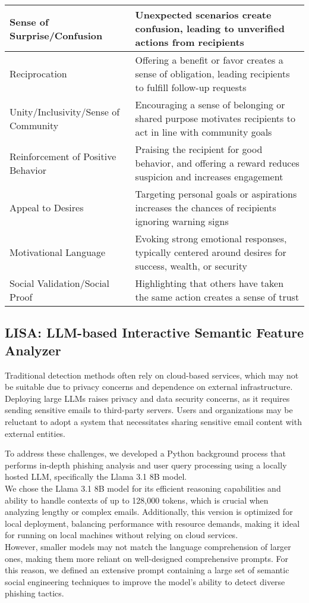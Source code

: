 \begin{table*}[ht]
\begin{tabular}{|p{4cm}|p{12cm}|}
\hline
Sense of Surprise/Confusion & Unexpected scenarios create confusion, leading to unverified actions from recipients \\ [0.4em]
\hline
Reciprocation & Offering a benefit or favor creates a sense of obligation, leading recipients to fulfill follow-up requests \\ [0.4em]
\hline
Unity/Inclusivity/Sense of Community & Encouraging a sense of belonging or shared purpose motivates recipients to act in line with community goals \\ [0.4em]
\hline
Reinforcement of Positive Behavior & Praising the recipient for good behavior, and offering a reward reduces suspicion and increases engagement \\ [0.4em]
\hline
Appeal to Desires & Targeting personal goals or aspirations increases the chances of recipients ignoring warning signs \\ [0.4em]
\hline
Motivational Language & Evoking strong emotional responses, typically centered around desires for success, wealth, or security \\[0.4em]
\hline
Social Validation/Social Proof & Highlighting that others have taken the same action creates a sense of trust \\ [0.4em]
\hline
\end{tabular}
\end{table*}



\subsection{LISA: LLM-based Interactive Semantic Feature Analyzer}
\label{sec:lisa}

Traditional detection methods often rely on cloud-based services, which may not be suitable due to privacy concerns and dependence on external infrastructure. Deploying large LLMs raises privacy and data security concerns, as it requires sending sensitive emails to third-party servers. Users and organizations may be reluctant to adopt a system that necessitates sharing sensitive email content with external entities. 

To address these challenges, we developed a Python background process that performs in-depth phishing analysis and user query processing using a locally hosted LLM, specifically the Llama 3.1 8B model.
\\
We chose the Llama 3.1 8B model for its efficient reasoning capabilities and ability to handle contexts of up to 128,000 tokens, which is crucial when analyzing lengthy or complex emails. Additionally, this version is optimized for local deployment, balancing performance with resource demands, making it ideal for running on local machines without relying on cloud services.
\\
However, smaller models may not match the language comprehension of larger ones, making them more reliant on well-designed comprehensive prompts. For this reason, we defined an extensive prompt containing a large set of semantic social engineering techniques to improve the model's ability to detect diverse phishing tactics.

